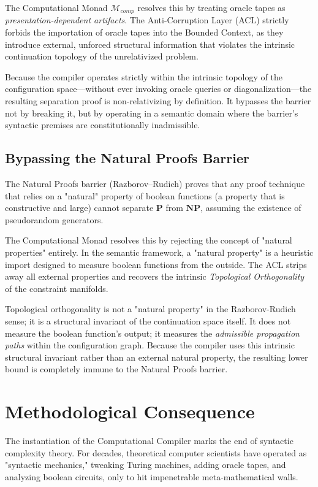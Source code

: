 \documentclass[12pt,openany]{extbook}
\theoremstyle{plain}
\theoremstyle{definition}
\begin{document}
The Computational Monad $\mathcal{M}_{comp}$ resolves this by treating oracle tapes as \emph{presentation-dependent artifacts}. The Anti-Corruption Layer (ACL) strictly forbids the importation of oracle tapes into the Bounded Context, as they introduce external, unforced structural information that violates the intrinsic continuation topology of the unrelativized problem. 

Because the compiler operates strictly within the intrinsic topology of the configuration space—without ever invoking oracle queries or diagonalization—the resulting separation proof is non-relativizing by definition. It bypasses the barrier not by breaking it, but by operating in a semantic domain where the barrier's syntactic premises are constitutionally inadmissible.

\subsection{Bypassing the Natural Proofs Barrier}
The Natural Proofs barrier (Razborov--Rudich) proves that any proof technique that relies on a "natural" property of boolean functions (a property that is constructive and large) cannot separate $\mathbf{P}$ from $\mathbf{NP}$, assuming the existence of pseudorandom generators.

The Computational Monad resolves this by rejecting the concept of "natural properties" entirely. In the semantic framework, a "natural property" is a heuristic import designed to measure boolean functions from the outside. The ACL strips away all external properties and recovers the intrinsic \emph{Topological Orthogonality} of the constraint manifolds. 

Topological orthogonality is not a "natural property" in the Razborov-Rudich sense; it is a structural invariant of the continuation space itself. It does not measure the boolean function's output; it measures the \emph{admissible propagation paths} within the configuration graph. Because the compiler uses this intrinsic structural invariant rather than an external natural property, the resulting lower bound is completely immune to the Natural Proofs barrier.

\section{Methodological Consequence}

The instantiation of the Computational Compiler marks the end of syntactic complexity theory. For decades, theoretical computer scientists have operated as "syntactic mechanics," tweaking Turing machines, adding oracle tapes, and analyzing boolean circuits, only to hit impenetrable meta-mathematical walls. 
\end{document}
